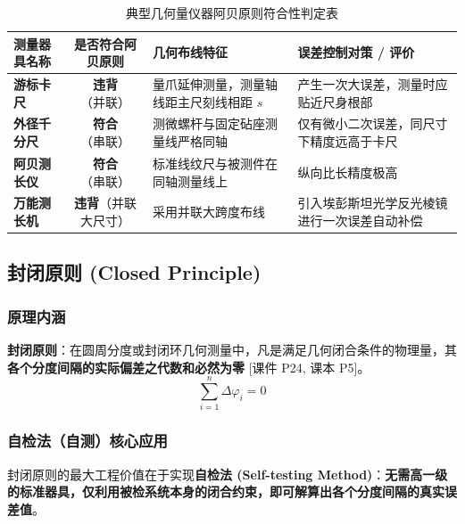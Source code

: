 \documentclass[11pt,a4paper]{ctexart}
\begin{document}
\begin{table}[htbp]
\centering
\small
\caption{典型几何量仪器阿贝原则符合性判定表}
\label{tab:abbe_instruments}
\begin{tabularx}{\textwidth}{l c p{4.5cm} X}
\toprule
\textbf{测量器具名称} & \textbf{是否符合阿贝原则} & \textbf{几何布线特征} & \textbf{误差控制对策 / 评价} \\
\midrule
\textbf{游标卡尺} & \textbf{违背}（并联） & 量爪延伸测量，测量轴线距主尺刻线相距 $s$ & 产生一次大误差，测量时应贴近尺身根部 \\
\textbf{外径千分尺} & \textbf{符合}（串联） & 测微螺杆与固定砧座测量线严格同轴 & 仅有微小二次误差，同尺寸下精度远高于卡尺 \\
\textbf{阿贝测长仪} & \textbf{符合}（串联） & 标准线纹尺与被测件在同轴测量线上 & 纵向比长精度极高 \\
\textbf{万能测长机} & \textbf{违背}（并联大尺寸） & 采用并联大跨度布线 & 引入埃彭斯坦光学反光棱镜进行一次误差自动补偿 \\
\bottomrule
\end{tabularx}
\end{table}

\subsection{封闭原则 (Closed Principle)}
\subsubsection{原理内涵}
\textbf{封闭原则}：在圆周分度或封闭环几何测量中，凡是满足几何闭合条件的物理量，其\textbf{各个分度间隔的实际偏差之代数和必然为零} \hfill\textsf{[课件 P24, 课本 P5]}。
\begin{equation}
\sum_{i=1}^n \Delta\varphi_i = 0
\end{equation}

\subsubsection{自检法（自测）核心应用}
封闭原则的最大工程价值在于实现\textbf{自检法 (Self-testing Method)}：\textbf{无需高一级的标准器具，仅利用被检系统本身的闭合约束，即可解算出各个分度间隔的真实误差值}。
\end{document}
